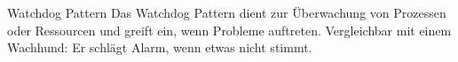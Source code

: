 \documentclass{beamer}
\begin{document}
\begin{frame}{Watchdog Pattern}
    Das Watchdog Pattern dient zur Überwachung von Prozessen oder Ressourcen und greift ein, wenn Probleme auftreten. Vergleichbar mit einem Wachhund: Er schlägt Alarm, wenn etwas nicht stimmt.
\end{frame}

\end{document}
